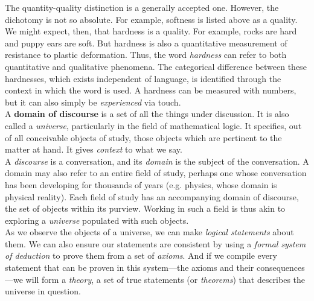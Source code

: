 The quantity-quality distinction is a generally accepted one. However, the dichotomy is not so absolute. For example, softness is listed above as a quality. We might expect, then, that hardness is a quality. For example, rocks are hard and puppy ears are soft. But hardness is also a quantitative measurement of resistance to plastic deformation. Thus, the word \textit{hardness} can refer to both quantitative and qualitative phenomena. The categorical difference between these hardnesses, which exists independent of language, is identified through the context in which the word is used. A hardness can be measured with numbers, but it can also simply be \textit{experienced} via touch. \\




A \textbf{domain of discourse} is a set of all the things under discussion. It is also called a \textit{universe}, particularly in the field of mathematical logic. It specifies, out of all conceivable objects of study, those objects which are pertinent to the matter at hand. It gives \textit{context} to what we say. \\

A \textit{discourse} is a conversation, and its \textit{domain} is the subject of the conversation. A domain may also refer to an entire field of study, perhaps one whose conversation has been developing for thousands of years (e.g. physics, whose domain is physical reality). Each field of study has an accompanying domain of discourse, the set of objects within its purview. Working in such a field is thus akin to exploring a \textit{universe} populated with such objects. \\

As we observe the objects of a universe, we can make \textit{logical statements} about them. We can also ensure our statements are consistent by using a \textit{formal system of deduction} to prove them from a set of \textit{axioms}. And if we compile every statement that can be proven in this system---the axioms and their consequences---we will form a \textit{theory}, a set of true statements (or \textit{theorems}) that describes the universe in question. \\

